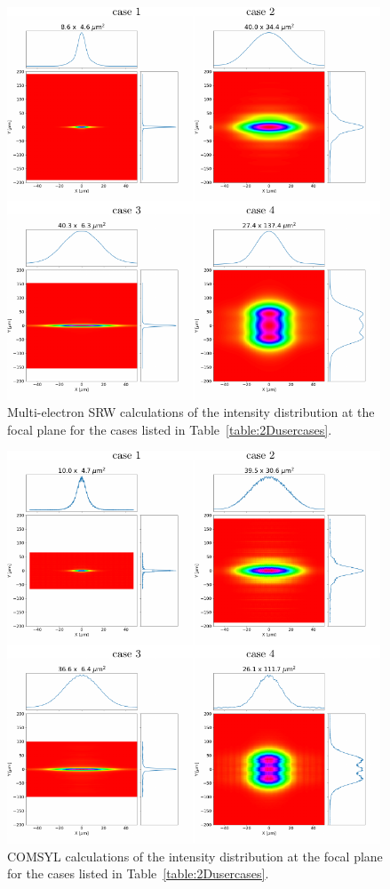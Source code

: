 \documentclass{iucr}              %
\begin{document}
\begin{figure}\label{fig:srw}
    \includegraphics[width=0.99\textwidth]{figures/fig_srw.pdf}
    \caption{Multi-electron SRW calculations of the intensity distribution at the focal plane for the cases listed in Table~\ref{table:2Dusercases}.}
\end{figure}


\begin{figure}\label{fig:comsyl}
    \includegraphics[width=0.99\textwidth]{figures/fig_comsyl.pdf}
    \caption{COMSYL calculations of the intensity distribution at the focal plane for the cases listed in Table~\ref{table:2Dusercases}.
    }
\end{figure}
\end{document}
